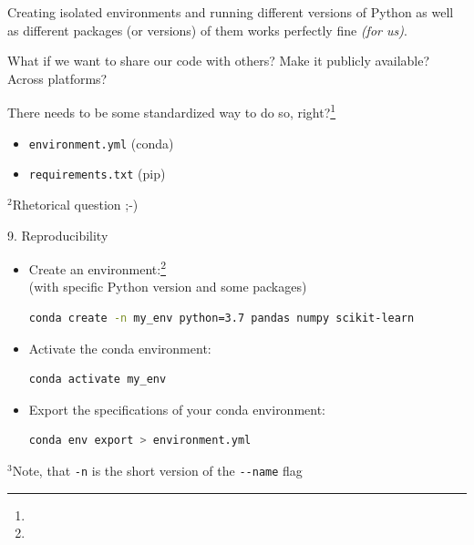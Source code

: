 
\begin{vbframe}{}

\vfill

Creating isolated environments and running different versions of Python as well
as different packages (or versions) of them works perfectly fine \textit{(for us)}.

\vspace{.3cm}

What if we want to share our code with others? Make it publicly available? Across platforms? 

\vspace{.3cm}

There needs to be some standardized way to do so, right?\footnote{}

\vspace{.3cm}

\begin{itemize}
	\item \texttt{environment.yml} (conda)
	\item \texttt{requirements.txt} (pip)
\end{itemize}

\vfill

\footnotesize $^2$Rhetorical question ;-)

\end{vbframe}


\begin{vbframe}{9. Reproducibility}

\vfill

\begin{itemize}
	\item Create an environment:\footnote{}\\
  (with specific Python version and some packages)
\begin{lstlisting}[language=bash,basicstyle=\tiny\ttfamily]
conda create -n my_env python=3.7 pandas numpy scikit-learn
\end{lstlisting}
	\item Activate the conda environment:
\begin{lstlisting}[language=bash]
conda activate my_env
\end{lstlisting}
	\item Export the specifications of your conda environment:
\begin{lstlisting}[language=bash]
conda env export > environment.yml
\end{lstlisting}
\end{itemize}

\vfill

\footnotesize $^3$Note, that \texttt{-n} is the short version of the \mbox{\texttt{-}}\texttt{-name} flag

\end{vbframe}

